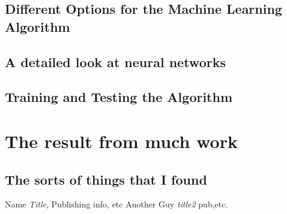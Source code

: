 \documentclass[a4paper,12pt]{report}
\begin{document}
\section{Different Options for the Machine Learning Algorithm}
\section{A detailed look at neural networks}
\section{Training and Testing the Algorithm}











\chapter{The result from much work}
\section{The sorts of things that I found}













\begin{thebibliography}{9}
    Name \emph{Title},
    Publishing info, etc
    Another Guy \emph{title2}
    pub,etc.






\end{thebibliography}
\end{document}
